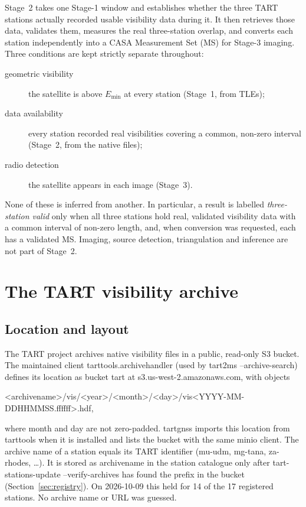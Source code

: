 \documentclass[11pt,a4paper]{article}
\newcommand{\code}[1]{{\ttfamily\def\_{\textunderscore\allowbreak}#1}}
\begin{document}
Stage~2 takes one Stage-1 window and establishes whether the three TART
stations actually recorded usable visibility data during it. It then
retrieves those data, validates them, measures the real three-station
overlap, and converts each station independently into a CASA Measurement
Set (MS) for Stage-3 imaging. Three conditions are kept strictly separate
throughout:
\begin{description}
\item[geometric visibility] the satellite is above $E_{\min}$ at every
station (Stage~1, from TLEs);
\item[data availability] every station recorded real visibilities covering
a common, non-zero interval (Stage~2, from the native files);
\item[radio detection] the satellite appears in each image (Stage~3).
\end{description}
None of these is inferred from another. In particular, a result is labelled
\emph{three-station valid} only when all three stations hold real, validated
visibility data with a common interval of non-zero length, and, when
conversion was requested, each has a validated MS. Imaging, source
detection, triangulation and inference are not part of Stage~2.

\section{The TART visibility archive}

\subsection{Location and layout}
\label{sec:archive}

The TART project archives native visibility files in a public, read-only S3
bucket. The maintained client \code{tart\_tools.archive\_handler} \cite{tarttools} (used by
\code{tart2ms --archive-search}) defines its location as bucket \code{tart}
at \code{s3.us-west-2.amazonaws.com}, with objects
\begin{center}
\code{<archive\_name>/vis/<year>/<month>/<day>/vis\_<YYYY-MM-DD\_HH\_MM\_SS.ffffff>.hdf},
\end{center}
where month and day are not zero-padded. \code{tart\_gnss} imports this
location from \code{tart\_tools} when it is installed and lists the bucket
with the same \code{minio} client. The archive name of a station equals its
TART identifier (\code{mu-udm}, \code{mg-tana}, \code{za-rhodes}, \dots).
It is stored as \code{archive\_name} in the station catalogue only after
\code{tart-stations-update --verify-archives} has found the prefix in the
bucket (Section~\ref{sec:registry}). On 2026-10-09 this held for 14 of the
17 registered stations. No archive name or URL was guessed.
\end{document}
